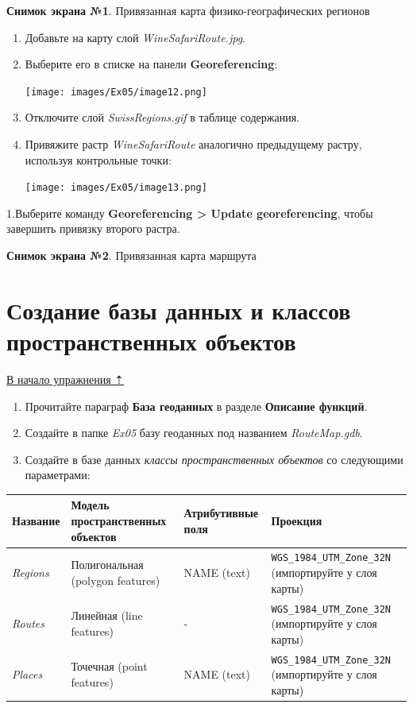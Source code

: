 \documentclass[12pt,]{book}
\begin{document}
\textbf{Снимок экрана №1}. Привязанная карта физико-географических регионов

\begin{enumerate}
\def\labelenumi{\arabic{enumi}.}
\item
  Добавьте на карту слой \emph{WineSafariRoute.jpg}.
\item
  Выберите его в списке на панели \textbf{Georeferencing}:

  \texttt{[image: images/Ex05/image12.png]}
\item
  Отключите слой \emph{SwissRegions.gif} в таблице содержания.
\item
  Привяжите растр \emph{WineSafariRoute} аналогично предыдущему растру, используя контрольные точки:

  \texttt{[image: images/Ex05/image13.png]}
\end{enumerate}

1.Выберите команду \textbf{Georeferencing \textgreater{} Update georeferencing}, чтобы завершить привязку второго растра.

\textbf{Снимок экрана №2}. Привязанная карта маршрута

\hypertarget{map-ref-general-geodatabase}{%
\section{Создание базы данных и классов пространственных объектов}\label{map-ref-general-geodatabase}}

\protect\hyperlink{map-ref-general}{В начало упражнения ⇡}

\begin{enumerate}
\def\labelenumi{\arabic{enumi}.}
\item
  Прочитайте параграф \textbf{База геоданных} в разделе \textbf{Описание функций}.
\item
  Создайте в папке \emph{Ex05} базу геоданных под названием \emph{RouteMap.gdb}.
\item
  Создайте в базе данных \emph{классы пространственных объектов} со следующими параметрами:
\end{enumerate}

\begin{longtable}[]{@{}llll@{}}
\toprule
Название & Модель пространственных объектов & Атрибутивные поля & Проекция\tabularnewline
\midrule
\endhead
\emph{Regions} & Полигональная (polygon features) & NAME (text) & \texttt{WGS\_1984\_UTM\_Zone\_32N} (импортируйте у слоя карты)\tabularnewline
\emph{Routes} & Линейная (line features) & - & \texttt{WGS\_1984\_UTM\_Zone\_32N} (импортируйте у слоя карты)\tabularnewline
\emph{Places} & Точечная (point features) & NAME (text) & \texttt{WGS\_1984\_UTM\_Zone\_32N} (импортируйте у слоя карты)\tabularnewline
\bottomrule
\end{longtable}
\end{document}
